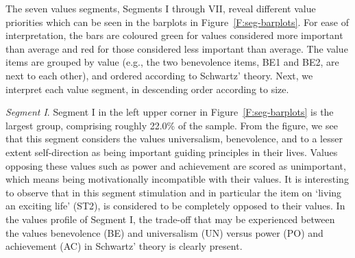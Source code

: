 \documentclass[12pt,letter]{article}\usepackage[]{graphicx}\usepackage[]{xcolor}
\makeatletter
\newenvironment{kframe}{%
 \def\at@end@of@kframe{}%
 \ifinner\ifhmode%
  \def\at@end@of@kframe{\end{minipage}}%
  \begin{minipage}{\columnwidth}%
 \fi\fi%
 \def\FrameCommand##1{\hskip\@totalleftmargin \hskip-\fboxsep
 \colorbox{shadecolor}{##1}\hskip-\fboxsep
     \hskip-\linewidth \hskip-\@totalleftmargin \hskip\columnwidth}%
 \MakeFramed {\advance\hsize-\width
   \@totalleftmargin\z@ \linewidth\hsize
   \@setminipage}}%
 {\par\unskip\endMakeFramed%
 \at@end@of@kframe}
\newenvironment{knitrout}{}{} %
\makeatother
\begin{document}
\begin{knitrout}\footnotesize
{}\color{fgcolor}\begin{kframe}


{\ttfamily\noindent\color{warningcolor}{Warning in readChar(con, 5L, useBytes = TRUE): cannot open compressed file 'NLCoordinates.RData', probable reason 'No such file or directory'}}

{\ttfamily\noindent\bfseries\color{errorcolor}{Error in readChar(con, 5L, useBytes = TRUE): cannot open the connection}}

{\ttfamily\noindent\bfseries\color{errorcolor}{Error in substr(Items\$Value, 1, 2): object 'Items' not found}}

{\ttfamily\noindent\bfseries\color{errorcolor}{Error in substr(Items\$Value, 3, 3): object 'Items' not found}}

{\ttfamily\noindent\bfseries\color{errorcolor}{Error in factor(segnms\_2017[Items\$time], levels = segnms\_2017): object 'Items' not found}}

{\ttfamily\noindent\bfseries\color{errorcolor}{Error in levels(Items\$Segment) <- seglevs\_perc: object 'Items' not found}}

{\ttfamily\noindent\bfseries\color{errorcolor}{Error in ifelse(Items\$x > 0, 2, 1): object 'Items' not found}}

{\ttfamily\noindent\bfseries\color{errorcolor}{Error in ifelse(Items\$x > 0, 1.3, -0.3): object 'Items' not found}}

{\ttfamily\noindent\bfseries\color{errorcolor}{Error in subset(Items, time != 7): object 'Items' not found}}\end{kframe}
\end{knitrout}

The seven values segments, Segments I through VII, reveal different value priorities which can be seen in the barplots in Figure~\ref{F:seg-barplots}. For ease of interpretation, the bars are coloured green for values considered more important than average and red for those considered less important than average. The value items are grouped by value (e.g., the two benevolence items, BE1 and BE2, are next to each other), and ordered according to Schwartz' theory. Next, we interpret each value segment, in descending order according to size.

\emph{Segment I}. Segment I in the left upper corner in Figure~\ref{F:seg-barplots} is the largest group, comprising roughly 22.0\% of the sample. From the figure, we see that this segment considers the values universalism, benevolence, and to a lesser extent self-direction as being important guiding principles in their lives. Values opposing these values such as power and achievement are scored as unimportant, which means being motivationally incompatible with their values. It is interesting to observe that in this segment stimulation and in particular the item on `living an exciting life' (ST2), is considered to be completely opposed to their values. In the values profile of Segment I, the trade-off that may be experienced between the values benevolence (BE) and universalism (UN) versus power (PO) and achievement (AC) in Schwartz' theory is clearly present. 
\end{document}
